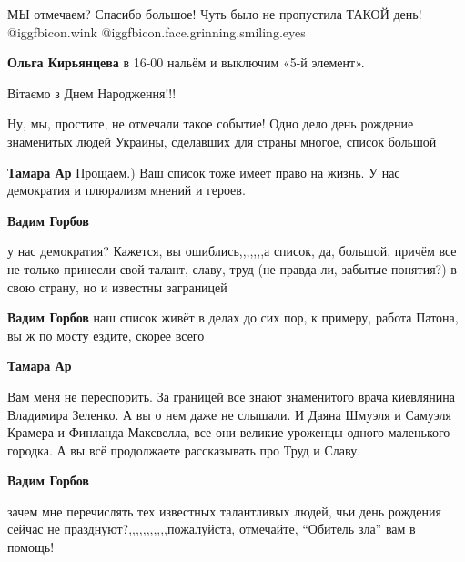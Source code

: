  
 
 
 
 
\zzSecCmt

\begin{itemize} %

МЫ отмечаем? Спасибо большое! Чуть было не пропустила ТАКОЙ день!
@igg{fbicon.wink}  @igg{fbicon.face.grinning.smiling.eyes} 

\textbf{Ольга Кирьянцева} в 16-00 нальём и выключим «5-й элемент».

Вітаємо з Днем Народження!!!


Ну, мы, простите, не отмечали такое событие! Одно дело день рождение знаменитых
людей Украины, сделавших для страны многое, список большой

\begin{itemize} %
\textbf{Тамара Ар} Прощаем.) Ваш список тоже имеет право на жизнь. У нас демократия и плюрализм мнений и героев.

\begin{itemize} %
\textbf{Вадим Горбов} 

у нас демократия? Кажется, вы ошиблись,,,,,,,а список, да, большой, причём все
не только принесли свой талант, славу, труд (не правда ли, забытые понятия?) в
свою страну, но и известны заграницей

\textbf{Вадим Горбов} наш список живёт в делах до сих пор, к примеру, работа Патона, вы ж по мосту ездите, скорее всего

\textbf{Тамара Ар} 

Вам меня не переспорить. За границей все знают знаменитого врача киевлянина
Владимира Зеленко. А вы о нем даже не слышали. И Даяна Шмуэля и Самуэля Крамера
и Финланда Максвелла, все они великие уроженцы одного маленького городка. А вы
всё продолжаете рассказывать про Труд и Славу.

\textbf{Вадим Горбов} 

зачем мне перечислять тех известных талантливых людей, чьи день рождения сейчас
не празднуют?,,,,,,,,,,,пожалуйста, отмечайте, \enquote{Обитель зла} вам в помощь!


\end{itemize}
\end{itemize}
\end{itemize}
